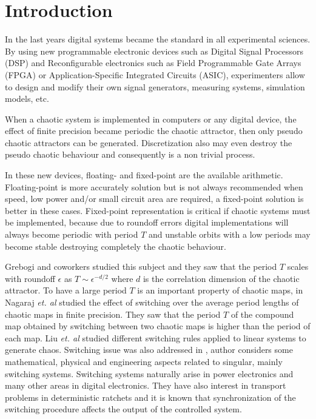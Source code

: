 \section{Introduction} \label{sec:intro}

In the last years digital systems became the standard in all experimental sciences.
By using new programmable electronic devices such as Digital Signal Processors (DSP) and Reconfigurable electronics such as Field Programmable Gate Arrays (FPGA) or Application-Specific Integrated Circuits (ASIC), experimenters allow to design and modify their own signal generators, measuring systems, simulation models, etc.

When a chaotic system is implemented in computers or any digital device, the effect of finite precision became periodic the chaotic attractor, then only pseudo chaotic attractors can be generated.
Discretization also may even destroy the pseudo chaotic behaviour and consequently is a non trivial process.

In these new devices, floating- and fixed-point are the available arithmetic.
Floating-point is more accurately solution but is not always recommended when speed, low power and/or small circuit area are required, a fixed-point solution is better in these cases.
Fixed-point representation is critical if chaotic systems must be implemented, because due to roundoff errors digital implementations will always become periodic with period $T$ and unstable orbits with a low periods may become stable destroying completely the chaotic behaviour.

Grebogi and coworkers \cite{Grebogi1988} studied this subject and they saw that the period $T$ scales with roundoff $\epsilon$ as $T\sim\epsilon^{-d/2}$ where $d$ is the correlation dimension of the chaotic attractor.
To have a large period $T$ is an important property of chaotic maps, in \cite{Nagaraj2008} Nagaraj \textit{et. al} studied the effect of switching over the average period lengths of chaotic maps in finite precision.
They saw that the period $T$ of the compound map obtained by switching between two chaotic maps is higher than the period of each map.
Liu \textit{et. al} \cite{Liu2006} studied different switching rules applied to linear systems to generate chaos.
Switching issue was also addressed in \cite{Gluskin2008}, author considers some mathematical, physical and engineering aspects related to singular, mainly switching systems.
Switching systems naturally arise in power electronics and many other areas in digital electronics.
They have also interest in transport problems in deterministic ratchets \cite{Zarlenga2009} and it is known that synchronization of the switching procedure affects the output of the controlled system.

